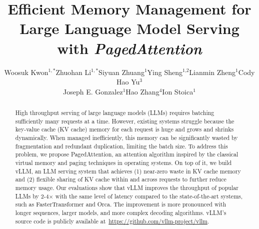 \documentclass[sigplan,10pt]{acmart}
\newcommand{\tech}[0]{PagedAttention\xspace}
\newcommand{\sys}[0]{vLLM\xspace}
\begin{document}
\title{Efficient Memory Management for Large Language Model Serving with \emph{PagedAttention}}

\author{Woosuk Kwon$^{\text{1}, *}$\enskip Zhuohan Li$^{\text{1}, *}$\enskip Siyuan Zhuang$^{\text{1}}$\enskip Ying Sheng$^{\text{1}, \text{2}}$\enskip Lianmin Zheng$^{\text{1}}$\enskip Cody Hao Yu$^{\text{3}}$\enskip \\ Joseph E. Gonzalez$^{\text{1}}$\enskip Hao Zhang$^{\text{4}}$\enskip Ion Stoica$^{\text{1}}$}

\begin{abstract}
High throughput serving of large language models (LLMs) requires batching sufficiently many requests at a time.
However, existing systems struggle because the key-value cache (KV cache) memory for each request is huge and grows and shrinks dynamically.
When managed inefficiently, this memory can be significantly wasted by fragmentation and redundant duplication, limiting the batch size.
To address this problem, we propose \tech, an attention algorithm inspired by the classical virtual memory and paging techniques in operating systems.
On top of it, we build \sys, an LLM serving system that achieves (1) near-zero waste in KV cache memory and (2) flexible sharing of KV cache within and across requests to further reduce memory usage.
Our evaluations show that \sys improves the throughput of popular LLMs by 2-4$\times$ with the same level of latency compared to the state-of-the-art systems, such as FasterTransformer and Orca.
The improvement is more pronounced with longer sequences, larger models, and more complex decoding algorithms.
\sys's source code is publicly available at~\url{https://github.com/vllm-project/vllm}.
\end{abstract}


\acmPrice{}

\maketitle
\pagestyle{plain}
\end{document}
